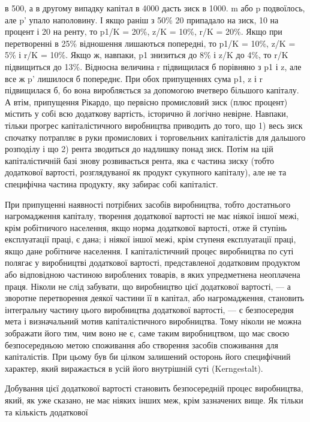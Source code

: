 \parcont{}  %
в 500, а в другому випадку капітал в 4000 дасть зиск в 1000.
m або p подвоїлось, але p' упало наполовину. І якщо раніш
з 50\% 20 припадало на зиск, 10 на процент і 20 на ренту, то p1/K =
20\%, z/K = 10\%, r/K = 20\%. Якщо при перетворенні в 25\%
відношення лишаються попередні, то p1/K = 10\%, z/K = 5\% і r/K =
10\%. Якщо ж, навпаки, p1 знизиться до 8\% і z/K до 4\%, то r/K
підвищиться до 13\%. Відносна величина r підвищилася б порівняно
з p1 і z, але все ж p' лишилося б попереднє. При обох припущеннях
сума p1, z і r підвищилася б, бо вона виробляється
за допомогою вчетверо більшого капіталу. А втім, припущення
Рікардо, що первісно промисловий зиск (плюс процент) містить
у собі всю додаткову вартість, історично й логічно невірне.
Навпаки, тільки прогрес капіталістичного виробництва приводить
до того, що 1) весь зиск спочатку потрапляє в руки промислових
і торговельних капіталістів для дальшого розподілу
і що 2) рента зводиться до надлишку понад зиск. Потім на цій
капіталістичній базі знову розвивається рента, яка є частина зиску
(тобто додаткової вартості, розглядуваної як продукт сукупного
капіталу), але не та специфічна частина продукту, яку забирає
собі капіталіст.

При припущенні наявності потрібних засобів виробництва,
тобто достатнього нагромадження капіталу, творення додаткової
вартості не має ніякої іншої межі, крім робітничого населення,
якщо норма додаткової вартості, отже й ступінь експлуатації
праці, є дана; і ніякої іншої межі, крім ступеня експлуатації
праці, якщо дане робітниче населення. І капіталістичний
процес виробництва по суті полягає у виробництві додаткової
вартості, представленої додатковим продуктом або відповідною
частиною вироблених товарів, в яких упредметнена неоплачена
праця. Ніколи не слід забувати, що виробництво цієї додаткової
вартості, — а зворотне перетворення деякої частини її в капітал,
або нагромадження, становить інтегральну частину цього виробництва
додаткової вартості, — є безпосередня мета і визначальний
мотив капіталістичного виробництва. Тому ніколи не можна зображати
його тим, чим воно не є, саме таким виробництвом, що має
своєю безпосередньою метою споживання або створення засобів
споживання для капіталістів. При цьому був би цілком
залишений осторонь його специфічний характер, який виражається
в усій його внутрішній суті (Kerngestalt).

Добування цієї додаткової вартості становить безпосередній
процес виробництва, який, як уже сказано, не має ніяких інших
меж, крім зазначених вище. Як тільки та кількість додаткової
\parbreak{}  %
